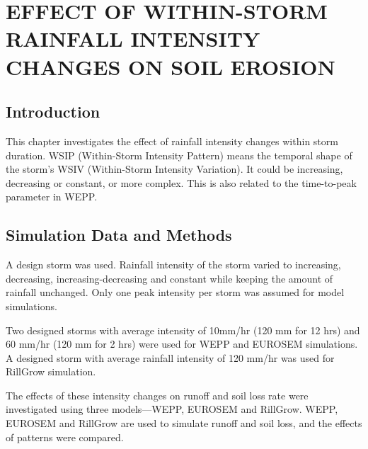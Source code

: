\chapter{EFFECT OF WITHIN-STORM RAINFALL INTENSITY CHANGES ON SOIL EROSION}
\label{sec:EFFECTSOFRAINFALLINTENSITYCHANGESONSOILEROSION}

\section{Introduction}
\label{sec:IntensiyPatternsIntroduction}
This chapter investigates the effect of rainfall intensity changes within
storm duration. WSIP (Within-Storm Intensity Pattern) means the temporal shape
of the storm's WSIV (Within-Storm Intensity Variation). It could be increasing,
decreasing or constant, or more complex. This is also related to the
time-to-peak parameter in WEPP.

\section{Simulation Data and Methods}
\label{sec:IntensiyPatternsMethods}


A design storm was used. Rainfall intensity of the storm varied
to increasing, decreasing, increasing-decreasing and constant while keeping the
amount of rainfall unchanged.
Only one peak intensity per storm was assumed for model simulations.

Two designed storms with average intensity of 10mm/hr (120 mm for 12 hrs)
and 60 mm/hr (120 mm for 2 hrs) were used for WEPP and EUROSEM simulations.
A designed storm with average rainfall intensity of 120 mm/hr was used for
RillGrow simulation.

The effects of these intensity changes on runoff and soil loss rate were
investigated using three models---WEPP, EUROSEM and RillGrow.
WEPP, EUROSEM and RillGrow are used to simulate runoff and soil loss, and
the effects of patterns were compared.

